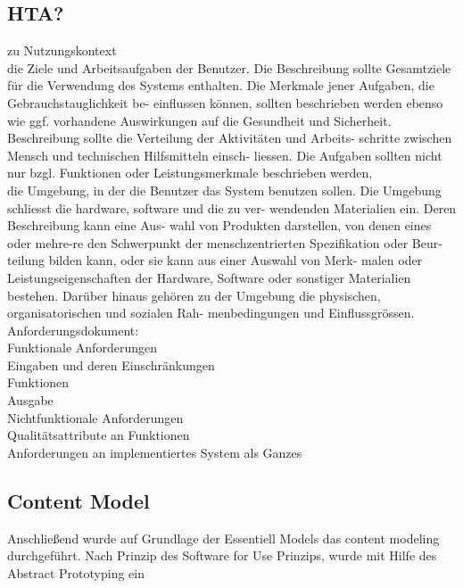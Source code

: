 \subsection{HTA?}

zu Nutzungskontext\\
die Ziele und Arbeitsaufgaben der Benutzer. Die Beschreibung sollte Gesamtziele für die Verwendung des Systems enthalten. Die Merkmale jener Aufgaben, die Gebrauchstauglichkeit be- einflussen können, sollten beschrieben werden ebenso wie ggf. vorhandene Auswirkungen auf die Gesundheit und Sicherheit. Beschreibung sollte die Verteilung der Aktivitäten und Arbeits- schritte zwischen Mensch und technischen Hilfsmitteln einsch- liessen. Die Aufgaben sollten nicht nur bzgl. Funktionen oder Leistungsmerkmale beschrieben werden,\\

die Umgebung, in der die Benutzer das System benutzen sollen. Die Umgebung schliesst die hardware, software und die zu ver- wendenden Materialien ein. Deren Beschreibung kann eine Aus- wahl von Produkten darstellen, von denen eines oder mehre-re den Schwerpunkt der menschzentrierten Spezifikation oder Beur- teilung bilden kann, oder sie kann aus einer Auswahl von Merk- malen oder Leistungseigenschaften der Hardware, Software oder sonstiger Materialien bestehen. Darüber hinaus gehören zu der Umgebung die physischen, organisatorischen und sozialen Rah- menbedingungen und Einflussgrössen.\\


Anforderungsdokument:\\
Funktionale Anforderungen\\
Eingaben und deren Einschränkungen\\
Funktionen\\
Ausgabe\\

Nichtfunktionale Anforderungen\\
Qualitätsattribute an Funktionen\\
Anforderungen an implementiertes System als Ganzes\\


\subsection{Content Model}
Anschließend wurde auf Grundlage der Essentiell Models das content modeling durchgeführt. Nach Prinzip des Software for Use Prinzips, wurde mit Hilfe des Abstract Prototyping ein


